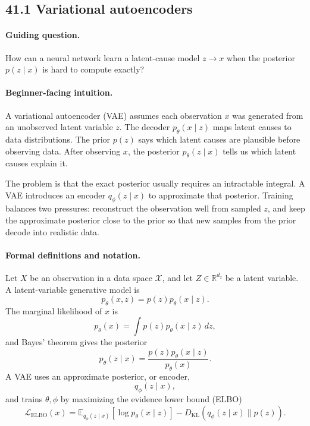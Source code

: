 \subsection{41.1 Variational autoencoders}

\paragraph{Guiding question.}
How can a neural network learn a latent-cause model \(z\to x\) when the posterior \(p(z\mid x)\) is hard to compute exactly?

\paragraph{Beginner-facing intuition.}
A variational autoencoder (VAE) assumes each observation \(x\) was generated from an unobserved latent variable \(z\). The decoder \(p_\theta(x\mid z)\) maps latent causes to data distributions. The prior \(p(z)\) says which latent causes are plausible before observing data. After observing \(x\), the posterior \(p_\theta(z\mid x)\) tells us which latent causes explain it.

The problem is that the exact posterior usually requires an intractable integral. A VAE introduces an encoder \(q_\phi(z\mid x)\) to approximate that posterior. Training balances two pressures: reconstruct the observation well from sampled \(z\), and keep the approximate posterior close to the prior so that new samples from the prior decode into realistic data.

\paragraph{Formal definitions and notation.}
Let \(X\) be an observation in a data space \(\mathcal X\), and let \(Z\in\mathbb{R}^{d_z}\) be a latent variable. A latent-variable generative model is
\[
p_\theta(x,z)=p(z)p_\theta(x\mid z).
\]
The marginal likelihood of \(x\) is
\[
p_\theta(x)=\int p(z)p_\theta(x\mid z)\,dz,
\]
and Bayes' theorem gives the posterior
\[
p_\theta(z\mid x)=\frac{p(z)p_\theta(x\mid z)}{p_\theta(x)}.
\]
A VAE uses an approximate posterior, or encoder,
\[
q_\phi(z\mid x),
\]
and trains \(\theta,\phi\) by maximizing the evidence lower bound (ELBO)
\[
\boxed{
\mathcal L_{\mathrm{ELBO}}(x)
=
\mathbb{E}_{q_\phi(z\mid x)}[\log p_\theta(x\mid z)]
-D_{\mathrm{KL}}(q_\phi(z\mid x)\|p(z)).
}
\]

